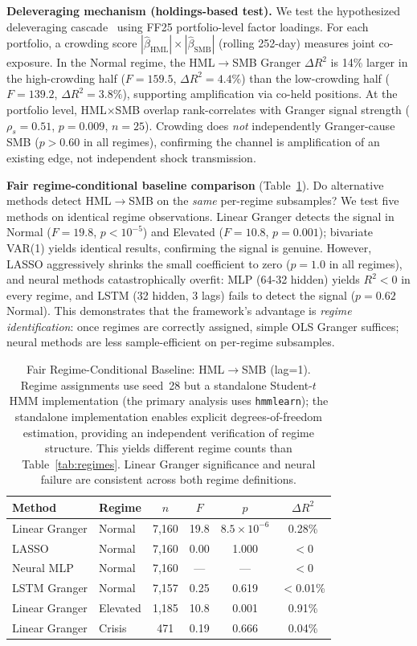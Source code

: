 \documentclass[sigconf,anonymous]{acmart}
\begin{document}
\textbf{Deleveraging mechanism (holdings-based test).}
We test the hypothesized deleveraging
cascade~\cite{brunnermeier2009market} using FF25 portfolio-level factor
loadings. For each portfolio, a crowding score
$|\hat\beta_{\text{HML}}| \times |\hat\beta_{\text{SMB}}|$ (rolling 252-day)
measures joint co-exposure. In the Normal regime, the HML$\to$SMB
Granger $\Delta R^2$ is 14\% larger in the high-crowding half
($F = 159.5$, $\Delta R^2 = 4.4\%$) than the low-crowding half
($F = 139.2$, $\Delta R^2 = 3.8\%$), supporting amplification via
co-held positions. At the portfolio level, HML$\times$SMB overlap
rank-correlates with Granger signal strength ($\rho_s = 0.51$,
$p = 0.009$, $n = 25$). Crowding does \emph{not} independently
Granger-cause SMB ($p > 0.60$ in all regimes), confirming the channel
is amplification of an existing edge, not independent shock transmission.

\textbf{Fair regime-conditional baseline comparison} (Table~\ref{tab:baseline}).
Do alternative methods detect HML$\to$SMB on the \emph{same}
per-regime subsamples? We test five methods on identical regime
observations. Linear Granger detects the signal in
Normal ($F = 19.8$, $p < 10^{-5}$) and Elevated ($F = 10.8$,
$p = 0.001$); bivariate VAR(1) yields identical results, confirming
the signal is genuine.
However, LASSO aggressively shrinks the small coefficient to zero
($p = 1.0$ in all regimes), and neural methods catastrophically
overfit: MLP (64-32 hidden) yields $R^2 < 0$ in every regime,
and LSTM (32 hidden, 3 lags) fails to detect the signal
($p = 0.62$ Normal). This demonstrates that the framework's
advantage is \emph{regime identification}: once regimes are correctly
assigned, simple OLS Granger suffices; neural methods are less
sample-efficient on per-regime subsamples.

\begin{table}[t]
\centering
\caption{Fair Regime-Conditional Baseline: HML$\to$SMB (lag=1).
Regime assignments use seed~28 but a standalone Student-$t$ HMM
implementation (the primary analysis uses \texttt{hmmlearn});
the standalone implementation enables explicit degrees-of-freedom
estimation, providing an independent verification of regime structure.
This yields different regime counts than Table~\ref{tab:regimes}.
Linear Granger significance and neural failure are consistent
across both regime definitions.}
\label{tab:baseline}
\scriptsize
\begin{tabular}{@{}llcccc@{}}
\toprule
Method & Regime & $n$ & $F$ & $p$ & $\Delta R^2$ \\
\midrule
Linear Granger & Normal & 7{,}160 & 19.8 & $8.5 \times 10^{-6}$ & 0.28\% \\
LASSO & Normal & 7{,}160 & 0.00 & 1.000 & $<$0 \\
Neural MLP & Normal & 7{,}160 & --- & --- & $<$0 \\
LSTM Granger & Normal & 7{,}157 & 0.25 & 0.619 & $<$0.01\% \\
\midrule
Linear Granger & Elevated & 1{,}185 & 10.8 & 0.001 & 0.91\% \\
Linear Granger & Crisis & 471 & 0.19 & 0.666 & 0.04\% \\
\bottomrule
\end{tabular}
\end{table}
\end{document}
